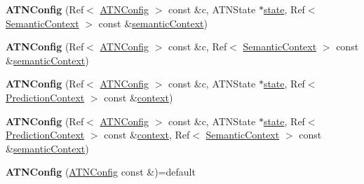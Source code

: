 \begin{DoxyCompactItemize}
{\bfseries A\+T\+N\+Config} (Ref$<$ \hyperlink{classantlr4_1_1atn_1_1ATNConfig}{A\+T\+N\+Config} $>$ const \&c, A\+T\+N\+State $\ast$\hyperlink{classantlr4_1_1atn_1_1ATNConfig_ae2e2757839f60f245b1a30c1f83bd52d}{state}, Ref$<$ \hyperlink{classantlr4_1_1atn_1_1SemanticContext}{Semantic\+Context} $>$ const \&\hyperlink{classantlr4_1_1atn_1_1ATNConfig_a99d4da95eab2009d3f0605aa8c051092}{semantic\+Context})
\item 
\mbox{\label{classantlr4_1_1atn_1_1ATNConfig_a2fd76ca1075bf19dc9785559816ed66c}} 
{\bfseries A\+T\+N\+Config} (Ref$<$ \hyperlink{classantlr4_1_1atn_1_1ATNConfig}{A\+T\+N\+Config} $>$ const \&c, Ref$<$ \hyperlink{classantlr4_1_1atn_1_1SemanticContext}{Semantic\+Context} $>$ const \&\hyperlink{classantlr4_1_1atn_1_1ATNConfig_a99d4da95eab2009d3f0605aa8c051092}{semantic\+Context})
\item 
\mbox{\label{classantlr4_1_1atn_1_1ATNConfig_af728088ce35d2b674223ca6a064ee32f}} 
{\bfseries A\+T\+N\+Config} (Ref$<$ \hyperlink{classantlr4_1_1atn_1_1ATNConfig}{A\+T\+N\+Config} $>$ const \&c, A\+T\+N\+State $\ast$\hyperlink{classantlr4_1_1atn_1_1ATNConfig_ae2e2757839f60f245b1a30c1f83bd52d}{state}, Ref$<$ \hyperlink{classantlr4_1_1atn_1_1PredictionContext}{Prediction\+Context} $>$ const \&\hyperlink{classantlr4_1_1atn_1_1ATNConfig_a1f30878a632f67672f16b52eefb01f26}{context})
\item 
\mbox{\label{classantlr4_1_1atn_1_1ATNConfig_abdb202bbb0a83139927915c04de72e30}} 
{\bfseries A\+T\+N\+Config} (Ref$<$ \hyperlink{classantlr4_1_1atn_1_1ATNConfig}{A\+T\+N\+Config} $>$ const \&c, A\+T\+N\+State $\ast$\hyperlink{classantlr4_1_1atn_1_1ATNConfig_ae2e2757839f60f245b1a30c1f83bd52d}{state}, Ref$<$ \hyperlink{classantlr4_1_1atn_1_1PredictionContext}{Prediction\+Context} $>$ const \&\hyperlink{classantlr4_1_1atn_1_1ATNConfig_a1f30878a632f67672f16b52eefb01f26}{context}, Ref$<$ \hyperlink{classantlr4_1_1atn_1_1SemanticContext}{Semantic\+Context} $>$ const \&\hyperlink{classantlr4_1_1atn_1_1ATNConfig_a99d4da95eab2009d3f0605aa8c051092}{semantic\+Context})
\item 
\mbox{\label{classantlr4_1_1atn_1_1ATNConfig_a562b69b9d973c3526223298273d0eaff}} 
{\bfseries A\+T\+N\+Config} (\hyperlink{classantlr4_1_1atn_1_1ATNConfig}{A\+T\+N\+Config} const \&)=default

\end{DoxyCompactItemize}
